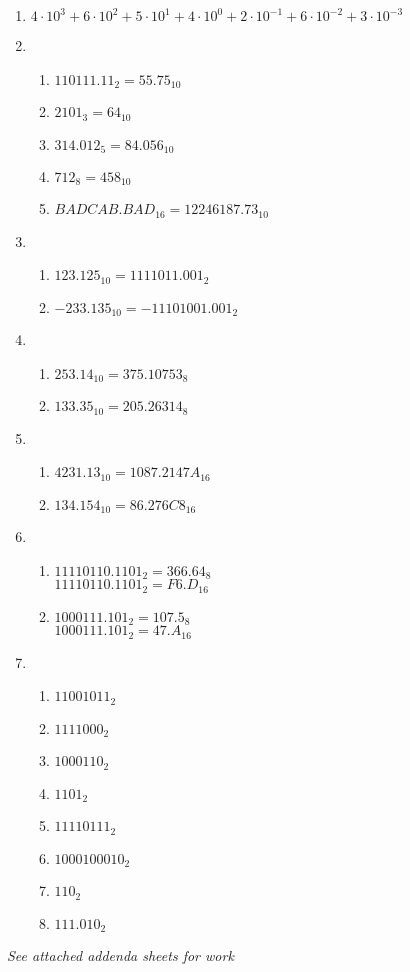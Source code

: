 \begin{enumerate}[leftmargin=2cm,labelsep=.5cm,label=\bf\arabic*.]
\item 
$4\cdot 10^3 +  6\cdot 10^2 + 5\cdot 10^1 + 4\cdot 10^0 + 2\cdot 10^{-1} + 6\cdot 10^{-2} + 3\cdot 10^{-3}$\\[5mm]
\item
\begin{enumerate}
\item $110111.11_2 = 55.75_{10}$
  \item $2101_3 = 64_{10}$
  \item $314.012_5 = 84.056_{10}$
  \item $712_8 = 458_{10}$
  \item $BADCAB.BAD_{16} = 12246187.73_{10}$\\[5mm]
\end{enumerate}
\item
\begin{enumerate}
  \item $123.125_{10}=1111011.001_2$
  \item $-233.135_{10}=-11101001.001_2$\\[5mm]
\end{enumerate}
\item

\begin{enumerate}
  \item $253.14_{10}=375.10753_8$
  \item $133.35_{10}=205.26314_8$\\[5mm]
\end{enumerate}
\item 
\begin{enumerate}
  \item $4231.13_{10}=1087.2147A_{16}$
  \item $134.154_{10}=86.276C8_{16}$\\[5mm]
\end{enumerate}
\item
\begin{enumerate}
  \item $11110110.1101_2=366.64_8$\\
     		$11110110.1101_2=F6.D_{16}$
  \item $1000111.101_2=107.5_8$\\
     		$1000111.101_2=47.A_{16}$\\[5mm]
\end{enumerate}
\item
\begin{enumerate}
  \item $11001011_2$
  \item $1111000_2$
  \item $1000110_2$
  \item $1101_2$
  \item $11110111_2$
  \item $1000100010_2$
  \item $110_2$
  \item $111.010_2$\\[5mm]
\end{enumerate}    
\end{enumerate}
\centering\textit{See attached addenda sheets for work}